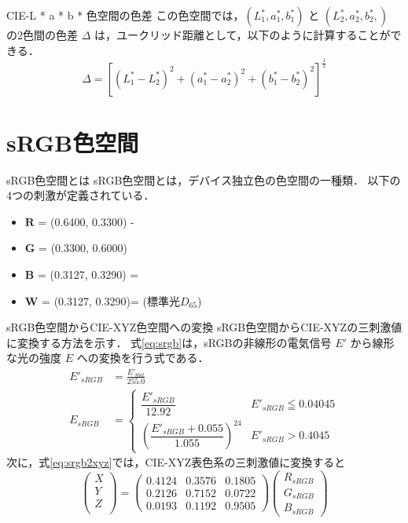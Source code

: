 \documentclass[8pt, jfont=ipaexm, t]{beamer} %
\begin{document}
\begin{frame}{CIE-L * a * b * 色空間の色差}
この色空間では，\((L^*_1, a^*_1, b^*_1)\)
と \((L^*_2, a^*_2, b^*_2,)\) の2色間の色差 \(\Delta\)
は，ユークリッド距離として，以下のように計算することができる．
\begin{equation}
\Delta = [(L^*_1- L^*_2)^2 + (a^*_1 - a^*_2)^2 + (b^*_1 - b^*_2)^2]^\frac{1}{2}
\end{equation}
\end{frame}

\section{sRGB色空間}

\begin{frame}{sRGB色空間とは}  
sRGB色空間とは，デバイス独立色の色空間の一種類．
以下の4つの刺激が定義されている．  
\begin{itemize}
\item \(\textbf{R}\) = (0.6400, 0.3300) -
\item \(\textbf{G}\) = (0.3300, 0.6000) 
\item \(\textbf{B}\) = (0.3127, 0.3290) =
\item \(\textbf{W}\) = (0.3127,  0.3290)= (標準光$D_{65}$)
\end{itemize}
\end{frame}

\begin{frame}{sRGB色空間からCIE-XYZ色空間への変換}
sRGB色空間からCIE-XYZの三刺激値に変換する方法を示す．
式\eqref{eq:srgb}は，sRGBの非線形の電気信号 \(E'\) から線形な光の強度 \(E\)
への変換を行う式である．
\begin{equation} \label{eq:srgb}
\begin{aligned}
E'_{sRGB} &= \frac{E'_{8bit}}{255.0} \\
E_{sRGB} &=
\begin{cases}
\dfrac{E'_{sRGB}}{12.92} & E'_{sRGB} \leqq 0.04045 \\
\left(\dfrac{E'_{sRGB} + 0.055}{1.055}\right)^{24} &E'_{sRGB} > 0.4045
\end{cases}
\end{aligned}
\end{equation}
次に，式\eqref{eq:srgb2xyz}では，CIE-XYZ表色系の三刺激値に変換すると 
\begin{equation} \label{eq:srgb2xyz}
\begin{pmatrix}
X \\
Y \\
Z \\
\end{pmatrix}
=
\begin{pmatrix}
0.4124 & 0.3576 & 0.1805 \\
0.2126 & 0.7152 & 0.0722 \\
0.0193 & 0.1192 & 0.9505 
\end{pmatrix}
\begin{pmatrix}
R_{sRGB} \\
G_{sRGB} \\
B_{sRGB}
\end{pmatrix}
\end{equation}
\end{frame}
\end{document}

